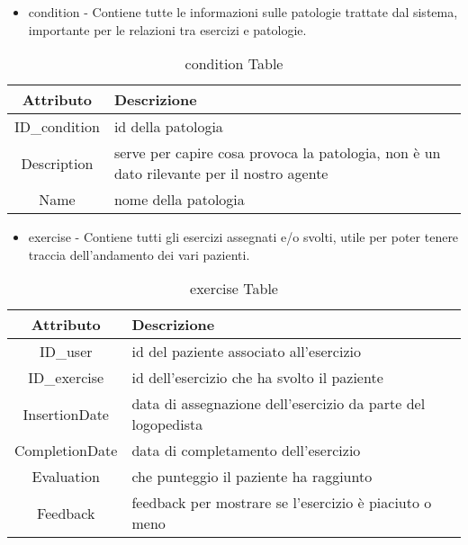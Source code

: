 \documentclass{article}
\begin{document}
\begin{itemize}
\item     condition - Contiene tutte le informazioni sulle patologie trattate dal sistema, importante per le relazioni tra esercizi e patologie.
\end{itemize}

    \begin{table}[h]
        \centering
        \caption{condition Table}
        \begin{tabular}{|c|p{8cm}|}
            \hline
                \textbf{Attributo} & \textbf{Descrizione} \\
            \hline
                ID\_condition & id della patologia\\
            \hline
                Description & serve per capire cosa provoca la patologia, non è un dato rilevante per il nostro agente\\
            \hline
                Name & nome della patologia\\
            \hline
        \end{tabular}
    \end{table}

\begin{itemize}
\item    exercise - Contiene tutti gli esercizi assegnati e/o svolti, utile per poter tenere traccia dell'andamento dei vari pazienti.
\end{itemize}

    \begin{table}[h]
        \centering
        \caption{exercise Table}
        \begin{tabular}{|c|p{8cm}|}
            \hline
                \textbf{Attributo} & \textbf{Descrizione} \\
            \hline
                ID\_user & id del paziente associato all'esercizio\\
            \hline
                ID\_exercise & id dell'esercizio che ha svolto il paziente\\
            \hline
                InsertionDate & data di assegnazione dell'esercizio da parte del logopedista\\
            \hline
                CompletionDate & data di completamento dell'esercizio\\
            \hline
                Evaluation & che punteggio il paziente ha raggiunto\\
            \hline
                Feedback & feedback per mostrare se l'esercizio è piaciuto o meno\\
            \hline
        \end{tabular}
    \end{table}
\end{document}
